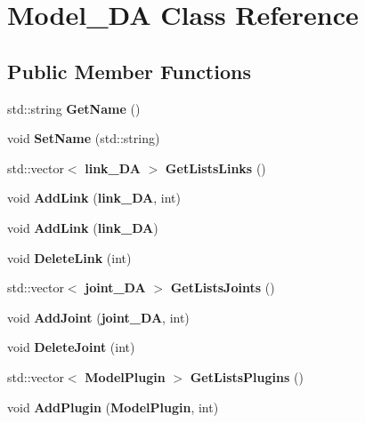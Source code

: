 \section{Model\+\_\+\+DA Class Reference}
\label{class_model___d_a}
\subsection*{Public Member Functions}
\begin{DoxyCompactItemize}
\item 
std\+::string {\bfseries Get\+Name} ()\label{class_model___d_a_a121fb679e5e8f8929c47e8278e347da6}

\item 
void {\bfseries Set\+Name} (std\+::string)\label{class_model___d_a_a0b9c246a200008234f4aa945da12bd97}

\item 
std\+::vector$<$ {\bf link\+\_\+\+DA} $>$ {\bfseries Get\+Lists\+Links} ()\label{class_model___d_a_a4ecd0dd5be7260a50267781fbe343d3d}

\item 
void {\bfseries Add\+Link} ({\bf link\+\_\+\+DA}, int)\label{class_model___d_a_a34522665dfbd487d48b963903d288eb0}

\item 
void {\bfseries Add\+Link} ({\bf link\+\_\+\+DA})\label{class_model___d_a_a206fb54b41623de0689918f4545ed763}

\item 
void {\bfseries Delete\+Link} (int)\label{class_model___d_a_a881cbb95bc1f8527bda1249efa44695a}

\item 
std\+::vector$<$ {\bf joint\+\_\+\+DA} $>$ {\bfseries Get\+Lists\+Joints} ()\label{class_model___d_a_ade99ee23a44ba388e3cf685ac78e22cd}

\item 
void {\bfseries Add\+Joint} ({\bf joint\+\_\+\+DA}, int)\label{class_model___d_a_ae758eecb0dea5272ff11ff526b11be39}

\item 
void {\bfseries Delete\+Joint} (int)\label{class_model___d_a_a72c2b16af0aa407ddb39da937aeafd1c}

\item 
std\+::vector$<$ {\bf Model\+Plugin} $>$ {\bfseries Get\+Lists\+Plugins} ()\label{class_model___d_a_ae0c0b682b015424f7462e0f9a3d14ba1}

\item 
void {\bfseries Add\+Plugin} ({\bf Model\+Plugin}, int)\label{class_model___d_a_ac6a00f7d7d14c64568668e5aa626d706}


\end{DoxyCompactItemize}
